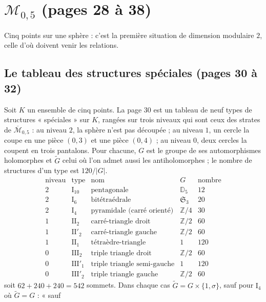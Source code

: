 \documentclass[11pt,a4paper]{article}
\begin{document}
\section*{$\mathcal{M}_{0,5}$ (pages 28 à 38)}

Cinq points sur une sphère : c'est la première situation de dimension modulaire
$2$, celle d'où doivent venir les relations.

\subsection*{Le tableau des structures spéciales (pages 30 à 32)}

Soit $K$ un ensemble de cinq points. La page 30 est un tableau de neuf types de
structures « spéciales » sur $K$, rangées sur trois niveaux qui sont ceux des
strates de $\overline{\mathcal{M}}_{0,5}$ : au niveau $2$, la sphère n'est pas
découpée ; au niveau $1$, un cercle la coupe en une pièce $(0,3)$ et une pièce
$(0,4)$ ; au niveau $0$, deux cercles la coupent en trois pantalons. Pour
chacune, $G$ est le groupe de ses automorphismes holomorphes et
$\widetilde{G}$ celui où l'on admet aussi les antiholomorphes ; le nombre de
structures d'un type est $120/|G|$.
\[
\begin{array}{lllll}
\text{niveau} & \text{type} & \text{nom} & G & \text{nombre} \\
2 & \mathrm{I}_{10} & \text{pentagonale} & \mathbb{D}_5 & 12 \\
2 & \mathrm{I}_{6} & \text{bitétraédrale} & \mathfrak{S}_3 & 20 \\
2 & \mathrm{I}_{4} & \text{pyramidale (carré orienté)} & \mathbb{Z}/4 & 30 \\
1 & \mathrm{II}_{2} & \text{carré-triangle droit} & \mathbb{Z}/2 & 60 \\
1 & \mathrm{II}'_{2} & \text{carré-triangle gauche} & \mathbb{Z}/2 & 60 \\
1 & \mathrm{II}_{1} & \text{tétraèdre-triangle} & 1 & 120 \\
0 & \mathrm{III}_{2} & \text{triple triangle droit} & \mathbb{Z}/2 & 60 \\
0 & \mathrm{III}'_{1} & \text{triple triangle semi-gauche} & 1 & 120 \\
0 & \mathrm{III}'_{2} & \text{triple triangle gauche} & \mathbb{Z}/2 & 60
\end{array}
\]
soit $62 + 240 + 240 = 542$ sommets. Dans chaque cas $\widetilde{G} = G \times
\{1, \sigma\}$, sauf pour $\mathrm{I}_4$ où $\widetilde{G} = G$ : « sauf
\end{document}
